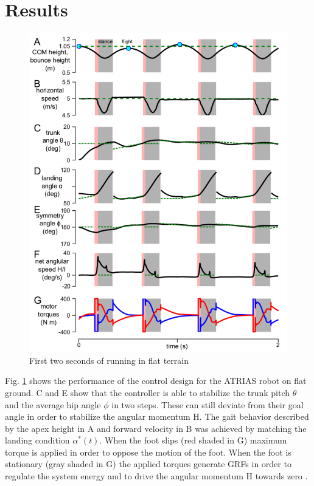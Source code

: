 \documentclass[10pt, conference]{IEEEtran}
\begin{document}
\section{Results}
\begin{figure}[h]
   \centering
   \includegraphics[scale=0.34]{"assets/results.pdf"}
   \caption{First two seconds of running in flat terrain \cite{Wu2014}}
   \label{results}
\end{figure}

Fig. \ref{results} shows the performance of the control design for the ATRIAS robot on flat ground. C and E show that the controller is able to stabilize the trunk pitch 
\({\theta}\) and the average hip angle \({\phi}\) in two steps. These can still deviate from their goal angle in order to stabilize the angular momentum H. 
The gait behavior described by the apex height in A and forward velocity in B was achieved by matching the landing condition \({\alpha}^{*}(t)\). 
When the foot slips (red shaded in G) maximum torque is applied in order to oppose the motion of the foot. When the foot is stationary (gray shaded in G) the applied torques generate GRFs in order to regulate the
 system energy and to drive the angular momentum H towards zero \cite{Wu2014}.
\end{document}
